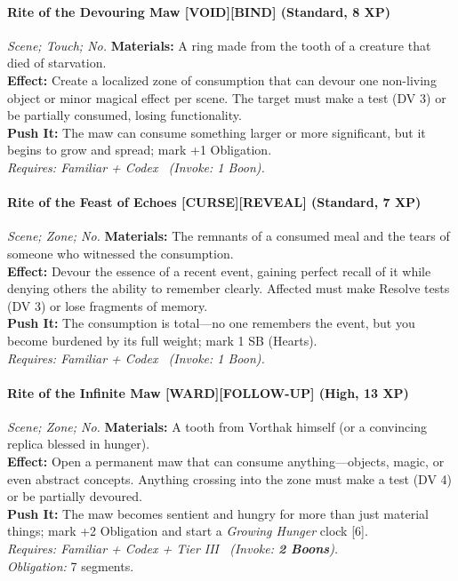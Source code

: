 \paragraph{Rite of the Devouring Maw \textnormal{[VOID][BIND]} (Standard, 8 XP)} \emph{Scene; Touch; No.}
\textbf{Materials:} A ring made from the tooth of a creature that died of starvation.\\
\textbf{Effect:} Create a localized zone of consumption that can devour one non-living object or minor magical effect per scene. The target must make a test (DV 3) or be partially consumed, losing functionality.\\
\textbf{Push It:} The maw can consume something larger or more significant, but it begins to grow and spread; mark +1 Obligation.\\
\emph{Requires: Familiar + Codex \ (\textit{Invoke:} 1 Boon).}

\paragraph{Rite of the Feast of Echoes \textnormal{[CURSE][REVEAL]} (Standard, 7 XP)} \emph{Scene; Zone; No.}
\textbf{Materials:} The remnants of a consumed meal and the tears of someone who witnessed the consumption.\\
\textbf{Effect:} Devour the essence of a recent event, gaining perfect recall of it while denying others the ability to remember clearly. Affected must make Resolve tests (DV 3) or lose fragments of memory.\\
\textbf{Push It:} The consumption is total—no one remembers the event, but you become burdened by its full weight; mark 1 SB (Hearts).\\
\emph{Requires: Familiar + Codex \ (\textit{Invoke:} 1 Boon).}

\paragraph{Rite of the Infinite Maw \textnormal{[WARD][FOLLOW-UP]} (High, 13 XP)} \emph{Scene; Zone; No.}
\textbf{Materials:} A tooth from Vorthak himself (or a convincing replica blessed in hunger).\\
\textbf{Effect:} Open a permanent maw that can consume anything—objects, magic, or even abstract concepts. Anything crossing into the zone must make a test (DV 4) or be partially devoured.\\
\textbf{Push It:} The maw becomes sentient and hungry for more than just material things; mark +2 Obligation and start a \emph{Growing Hunger} clock [6].\\
\emph{Requires: Familiar + Codex + Tier III \ (\textit{Invoke:} \textbf{2 Boons}).}\\
\emph{Obligation:} 7 segments.

